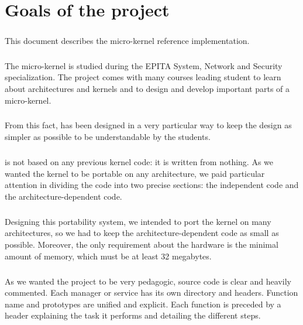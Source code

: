 
%
%

\chapter{Goals of the \kaneton project}

\newpage

\paragraph{}
This   document   describes   the  \kaneton   micro-kernel   reference
implementation.

\paragraph{}
The \kaneton micro-kernel is  studied during the EPITA System, Network
and  Security specialization.   The  project comes  with many  courses
leading student to learn about architectures and kernels and to design
and develop important parts of a micro-kernel.

\paragraph{}
From this fact, \kaneton has been designed in a very particular way to
keep the  design as  simpler as possible  to be understandable  by the
students.

\paragraph{}
\kaneton is not based on any previous kernel code: it is written from
nothing. As we  wanted the kernel to be  portable on any architecture,
we paid  particular attention  in dividing the  code into  two precise
sections: the independent code and the architecture-dependent code.

\paragraph{}
Designing this portability  system, we intended to port  the kernel on
many architectures, so we  had to keep the architecture-dependent code
as  small  as possible.   Moreover,  the  only  requirement about  the
hardware is  the minimal amount of  memory, which must be  at least 32
megabytes.

\paragraph{}
As we wanted the project to be very pedagogic, \kaneton source code is
clear  and heavily  commented. Each  manager  or service  has its  own
directory and  headers. Function name  and prototypes are  unified and
explicit. Each function is preceded by a header explaining the task it
performs and detailing the different steps.

